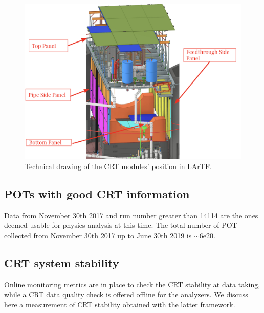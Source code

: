 \begin{figure}[h!]
\centering
\includegraphics[scale=0.3]{images/CRTScheme}
\caption{Technical drawing of the CRT modules' position in LArTF.}
\label{fig:CRT}
\end{figure}

\subsection{POTs with good CRT information}
Data from November 30th 2017 and run number greater than 14114 are the ones deemed usable for physics analysis at this time. The total number of POT collected from November 30th 2017 up to June 30th 2019 is $\sim$6e20.  



\subsection{CRT system stability}
Online monitoring metrics are in place to check the CRT stability at data taking, while a CRT data quality check is offered offline for the analyzers. We discuss here a measurement of CRT stability obtained with the latter framework.

